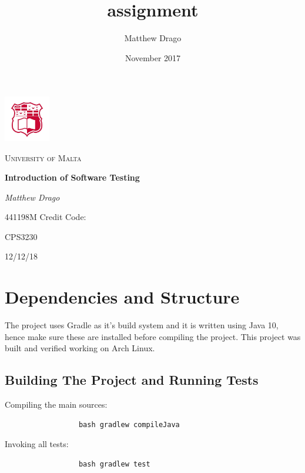 \documentclass[11pt, a4paper]{article}
\title{assignment}
\author{Matthew Drago }
\date{November 2017}
\begin{document}
\begin{titlepage}
	\centering
	\includegraphics[width=0.15\textwidth]{"uomlogo"}\par\vspace{1cm}
	{\scshape\LARGE University of Malta \par}
	\vspace{1cm}
	{\huge\bfseries Introduction of Software Testing
	\par}
	\vspace{2cm}
	
    \vspace{1.5cm}
    
	{\Large\itshape Matthew Drago\par}
	\par 441198M
	\vfill
	Credit Code: \par
	CPS3230

	\vfill

	{\large 12/12/18\par}
\end{titlepage}
\tableofcontents
\newpage
\section{Dependencies and Structure}
    The project uses Gradle as it's build system and it is written using Java 10, hence make sure these are installed before compiling the project. This project was built and verified working on Arch Linux.
    \subsection{Building The Project and Running Tests}
    Compiling the main sources: 
    \begin{figure}[H]
        \centering
        \begin{verbatim}
            bash gradlew compileJava
        \end{verbatim}
    \end{figure}
    
    Invoking all tests:
    \begin{figure}[H]
        \centering
        \begin{verbatim}
            bash gradlew test
        \end{verbatim}
    \end{figure}
\end{document}
